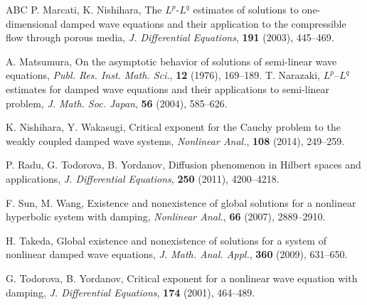 \documentclass[11pt,reqno]{amsart}
\begin{document}
\begin{thebibliography}{ABC}
		 P. Marcati, K. Nishihara, The $L^p$-$L^q$ estimates of solutions to one-dimensional damped wave equations and their application to the compressible flow through porous media, \textit{J. Differential Equations}, \textbf{191} (2003), 445--469.
		
		 A. Matsumura, On the asymptotic behavior of solutions of semi-linear wave equations, \textit{Publ. Res. Inst. Math. Sci.}, \textbf{12} (1976), 169--189.
		 T. Narazaki, $L^p$--$L^q$ estimates for damped wave equations and their applications to semi-linear problem, \textit{J. Math. Soc. Japan}, \textbf{56} (2004), 585--626.
		
		 K. Nishihara, Y. Wakasugi, Critical exponent for the Cauchy problem to the weakly coupled damped wave systems, \textit{Nonlinear Anal.}, \textbf{108} (2014), 249--259.
		
		 P. Radu, G. Todorova, B. Yordanov, Diffusion phenomenon in Hilbert spaces and applications, \textit{J. Differential Equations}, \textbf{250} (2011), 4200--4218.
		
		 F. Sun, M. Wang, Existence and nonexistence of global solutions for a nonlinear hyperbolic system with damping, \textit{Nonlinear Anal.}, \textbf{66} (2007), 2889--2910.
		
		 H. Takeda, Global existence and nonexistence of solutions for a system of nonlinear damped wave equations, \textit{J. Math. Anal. Appl.}, \textbf{360} (2009), 631--650.
		
		 G. Todorova, B. Yordanov, Critical exponent for a nonlinear wave equation with damping, \textit{J. Differential Equations}, \textbf{174} (2001), 464--489.
		
	\end{thebibliography}
	
\end{document}
